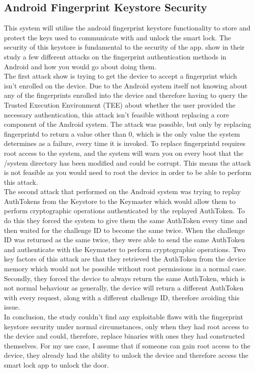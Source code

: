 \documentclass[10pt, a4paper]{article}
\begin{document}
\subsection{Android Fingerprint Keystore Security}
This system will utilise the android fingerprint keystore functionality to store and protect the keys used to communicate with and unlock the smart lock. The security of this keystore is fundamental to the security of the app. \cite{Does2016} show in their study a few different attacks on the fingerprint authentication methods in Android and how you would go about doing them.
\\
\indent The first attack \cite{Does2016} show is trying to get the device to accept a fingerprint which isn't enrolled on the device. Due to the Android system itself not knowing about any of the fingerprints enrolled into the device and therefore having to query the Trusted Execution Environment (TEE) about whether the user provided the necessary authentication, this attack isn't feasible without replacing a core component of the Android system. The attack was possible, but only by replacing fingerprintd to return a value other than 0, which is the only value the system determines as a failure, every time it is invoked. To replace fingerprintd requires root access to the system, and the system will warn you on every boot that the /system directory has been modified and could be corrupt. This means the attack is not feasible as you would need to root the device in order to be able to perform this attack.
\\
\indent The second attack that \cite{Does2016} performed on the Android system was trying to replay AuthTokens from the Keystore to the Keymaster which would allow them to perform cryptographic operations authenticated by the replayed AuthToken. To do this they forced the system to give them the same AuthToken every time and then waited for the challenge ID to become the same twice. When the challenge ID was returned as the same twice, they were able to send the same AuthToken and authenticate with the Keymaster to perform cryptographic operations. Two key factors of this attack are that they retrieved the AuthToken from the device memory which would not be possible without root permissions in a normal case. Secondly, they forced the device to always return the same AuthToken, which is not normal behaviour as generally, the device will return a different AuthToken with every request, along with a different challenge ID, therefore avoiding this issue.
\\
\indent In conclusion, the study couldn't find any exploitable flaws with the fingerprint keystore security under normal circumstances, only when they had root access to the device and could, therefore, replace binaries with ones they had constructed themselves. For my use case, I assume that if someone can gain root access to the device, they already had the ability to unlock the device and therefore access the smart lock app to unlock the door.
\end{document}
